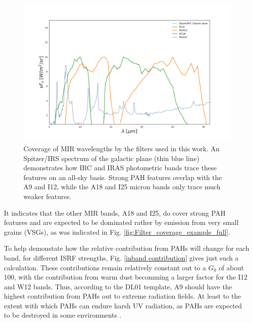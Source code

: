          \begin{figure}
           \centering
           \includegraphics[width=\textwidth]{../Plots/ch_datasources/Filter_coverage_example_MIR.pdf}
           \caption{Coverage of MIR wavelengths by the filters used in this work. An Spitzer/IRS spectrum of the galactic plane (thin blue line) demonstrates how IRC and IRAS photometric bands trace these features on an all-sky basis. Strong PAH features overlap with the A9 and I12, while the A18 and I25 micron bands only trace much weaker features. }
           \label{fig:Filter_coverage_example_MIR}
         \end{figure}
         It indicates that the other MIR bands, A18 and I25, do cover strong PAH features and are expected to be dominated rather by emission from very small grains (VSGs), as was indicated in Fig. \ref{fig:Filter_coverage_example_full}.

         To help demonstate how the relative contribution from PAHs will change for each band, for different ISRF strengths, Fig. \ref{inband contribution} gives just such a calculation. These contributions remain relatively constant out to a $G_{0}$ of about 100, with the contribution from warm dust becomming a larger factor for the I12 and W12 bands. Thus, according to the DL01 template, A9 should have the highest contribution from PAHs out to extreme radiation fields. At least to the extent with which PAHs can endure harsh UV radiation, as PAHs are expected to be destroyed in some environments \citep{allain96a,allain96b,pilleri12, pavlyuchenkov13}.

